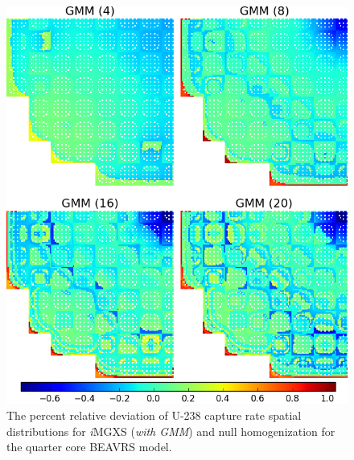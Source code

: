 \begin{figure}[h!]
\centering
\includegraphics[width=0.9\linewidth]{figures/results/compare/full-core/compare-capt-gmm}
\vspace{2mm}
\caption[U-238 capture rate comparison for the quarter core BEAVRS model]{The percent relative deviation of U-238 capture rate spatial distributions for \textit{i}\ac{MGXS} (\textit{with \ac{GMM}}) and null homogenization for the quarter core BEAVRS model.}
\label{fig:chap11-full-core-capt-rates-gmm-comp}
\end{figure}

\clearpage

